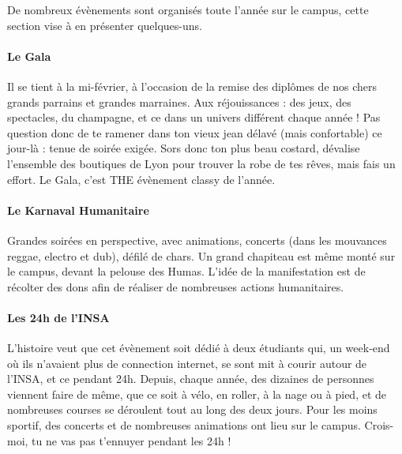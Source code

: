 De nombreux évènements sont organisés toute l'année sur le campus, cette section
vise à en présenter quelques-uns.

\paragraph{Le Gala}
Il se tient à la mi-février, à l'occasion de la remise des
diplômes de nos chers grands parrains et grandes marraines. Aux réjouissances :
des jeux, des spectacles, du champagne, et ce dans un univers différent chaque année !
Pas question donc de te ramener dans ton vieux jean délavé (mais confortable) ce
jour-là : tenue de soirée exigée. Sors donc ton plus beau costard, dévalise
l'ensemble des boutiques de Lyon pour trouver la robe de tes rêves, mais fais un
effort. Le Gala, c'est THE évènement classy de l'année.

\paragraph{Le Karnaval Humanitaire}
Grandes soirées en perspective, avec animations, concerts (dans les mouvances
reggae, electro et dub), défilé de chars. Un grand chapiteau est même monté sur le
campus, devant la pelouse des Humas. L'idée de la manifestation est de
récolter des dons afin de réaliser de nombreuses actions humanitaires.


 \paragraph{Les 24h de l'INSA}
 L'histoire veut que cet évènement soit dédié à deux étudiants qui, un
 week-end où ils n'avaient plus de connection internet, se sont mit à courir
 autour de l'INSA, et ce pendant 24h. Depuis, chaque année, des dizaines de
 personnes viennent faire de même, que ce soit à vélo, en roller, à la nage ou à
 pied, et de nombreuses courses se déroulent tout au long des deux jours. Pour les
 moins sportif, des concerts et de nombreuses animations ont lieu sur le
 campus. Crois-moi, tu ne vas pas t'ennuyer pendant les 24h !

